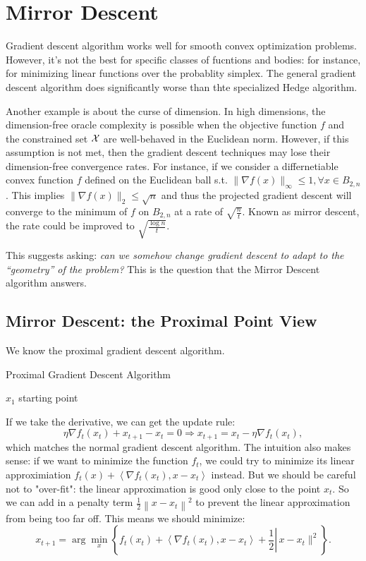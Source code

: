\chapter{Mirror Descent} 
Gradient descent algorithm works well for smooth convex optimization problems. However, it's not the best
for specific classes of fucntions and bodies: for instance, for minimizing linear functions over the probablity
simplex. The general gradient descent algorithm does significantly worse than thte specialized Hedge algorithm.

Another example is about the curse of dimension. In high dimensions, the dimension-free oracle complexity is possible when the objective function $f$ and the constrained set $\mathcal{X}$ are well-behaved in the Euclidean norm. However, if this assumption is not met, then the gradient descent techniques may lose their dimension-free convergence rates. For instance, if we consider a differnetiable convex function $f$ defined on the Euclidean ball s.t. $\|\nabla f(x)\|_\infty \le 1, \forall x \in B_{2,n}$. This implies $\|\nabla f(x) \|_2\le \sqrt{n}$ and thus the projected gradient descent will converge to the minimum of $f$ on $B_{2,n}$ at a rate of $\sqrt{\frac{n}{t}}$. Known as mirror descent,  the rate could be improved to $\sqrt{\frac{\log n}{t}}$.    

This suggests asking: {\it can we somehow change gradient descent to adapt to the ``geometry'' of the problem?}
This is the question that the Mirror Descent algorithm answers.

\section{Mirror Descent: the Proximal Point View} 
We know the proximal gradient descent algorithm.

\begin{algorithm}[H]
    \caption{Proximal Gradient Descent Algorithm}
    \label{algo PGD}
    $x_1$ starting point \; 
\end{algorithm}

If we take the derivative, we can get the update rule:
$$
\eta \nabla f_t\left(x_{t}\right)+x_{t+1}-x_t=0 \Longrightarrow x_{t+1}=x_t-\eta \nabla f_t\left(x_{t}\right),
$$
which matches the normal gradient descent algorithm. The intuition also makes sense: if we want to minimize the function $f_t$, we could try to minimize its linear approximiation $f_t(x)+\left\langle\nabla f_t\left(x_t\right), x-x_t\right\rangle$ instead. But we should be careful not to "over-fit": the linear approximation is good only close to the point $x_t$. So we can add in a penalty term $\frac{1}{2}\left\|x-x_t\right\|^2$ to prevent the linear approximation from being too far off. This means we should minimize:
$$
x_{t+1}=\arg \min _x\left\{\left.f_t\left(x_t\right)+\left\langle\nabla f_t\left(x_t\right), x-x_t\right\rangle+\frac{1}{2} \right\rvert\, x-x_t \|^2\right\} .
$$

